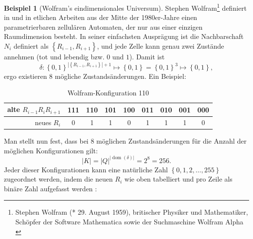 \documentclass[11pt]{article} %
\theoremstyle{definition}
\newtheorem*{beisp}{Beispiel}
\begin{document}
\begin{beisp}[Wolfram's eindimensionales Universum] Stephen Wolfram\footnote{Stephen Wolfram (* 29. August 1959), britischer Physiker und Mathematiker, Schöpfer der Software Mathematica sowie der Suchmaschine Wolfram Alpha \cite{wiki:wolfram}} definiert in \cite{wolfram2002} und in etlichen Arbeiten aus der Mitte der 1980er-Jahre einen parametrierbaren zellulären Automaten, der nur aus einer einzigen Raumdimension besteht\cite{wiki:wolfram}. In seiner einfachsten Ausprägung ist die Nachbarschaft $N_i$ definiert als $\left\{ R_{i-1}, R_{i+1} \right\}$, und jede Zelle kann genau zwei Zustände annehmen (tot und lebendig bzw. $0$ und $1$). Damit ist
\begin{equation*}
\delta : \left\{0,1\right\}^{|\left\{ R_{i-1}, R_{i+1}\right\}|+ 1} \mapsto \left\{0,1\right\} = \left\{0,1\right\}^3 \mapsto \left\{0,1\right\},
\end{equation*}
ergo existieren 8 mögliche Zustandsänderungen. Ein Beispiel:

\begin{table}[here]
\begin{center}
\begin{tabular}{|r||c|c|c|c|c|c|c|c|}
\hline
alte $R_{i-1}R_iR_{i+1}$ &111& 110 & 101 &100 &011 &010 &001 &000  \\\hline
neues $R_i$ & 0 & 1 & 1 & 0& 1 & 1 & 1 & 0 \\\hline
\end{tabular}
\end{center}
\caption{Wolfram-Konfiguration 110}
\label{wolfram110}
\end{table}

Man stellt nun fest, dass bei 8 möglichen Zustandsänderungen für die Anzahl der möglichen Konfigurationen gilt:
\begin{equation*}
|K| = |Q|^{|\operatorname{dom}(\delta)|} = 2^8 = 256.
\end{equation*}
Jeder dieser Konfigurationen kann eine natürliche Zahl $\left\{0, 1, 2, \dots, 255\right\}$ zugeordnet werden, indem die neuen $R_i$ wie oben tabelliert und pro Zeile als binäre Zahl aufgefasst werden \cite{betz2003}:


\end{beisp}
\end{document}
